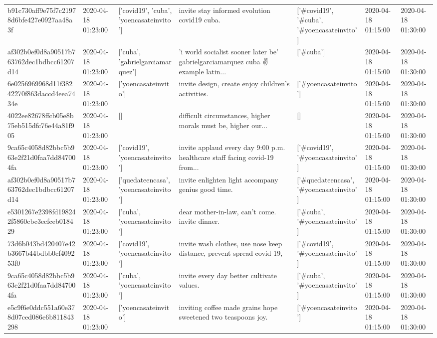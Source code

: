 \begin{tabular}{lllllll}
b91c730aff9e75f7c21978d6bfe427e0927aa48a3f & 2020-04-18 01:23:00 & ['covid19', 'cuba', 'yoencasateinvito'] & invite stay informed evolution covid19 cuba. & ['#covid19', '#cuba', '#yoencasateinvito'] & 2020-04-18 01:15:00 & 2020-04-18 01:30:00 \\
af302b0ef0d8a90517b763762dec1bdbcc61207d14 & 2020-04-18 01:23:00 & ['cuba', 'gabrielgarciamarquez'] & 'i world socialist sooner later be' gabrielgarciamarquez cuba ✌️ example latin... & ['#cuba'] & 2020-04-18 01:15:00 & 2020-04-18 01:30:00 \\
6e0256969968d11f38242270f863daccd4eea7434e & 2020-04-18 01:23:00 & ['yoencasateinvito'] & invite design, create enjoy children's activities. & ['#yoencasateinvito'] & 2020-04-18 01:15:00 & 2020-04-18 01:30:00 \\
4022ee82678ffcb05e8b75eb515dfc76e44a81f905 & 2020-04-18 01:23:00 & [] & difficult circumstances, higher morals must be, higher our... & [] & 2020-04-18 01:15:00 & 2020-04-18 01:30:00 \\
9ca65c4058d82bbc5b963e2f21d0faa7dd847004fa & 2020-04-18 01:23:00 & ['covid19', 'yoencasateinvito'] & invite applaud every day 9:00 p.m. healthcare staff facing covid-19 from... & ['#covid19', '#yoencasateinvito'] & 2020-04-18 01:15:00 & 2020-04-18 01:30:00 \\
af302b0ef0d8a90517b763762dec1bdbcc61207d14 & 2020-04-18 01:23:00 & ['quedateencasa', 'yoencasateinvito'] & invite enlighten light accompany genius good time. & ['#quedateencasa', '#yoencasateinvito'] & 2020-04-18 01:15:00 & 2020-04-18 01:30:00 \\
e5301267e2398fd198242f5860cbc3ecfceb018429 & 2020-04-18 01:23:00 & ['cuba', 'yoencasateinvito'] & dear mother-in-law, can't come. invite dinner. & ['#cuba', '#yoencasateinvito'] & 2020-04-18 01:15:00 & 2020-04-18 01:30:00 \\
73d6b043bd420407e42b3667b44bdbb0cf409253f0 & 2020-04-18 01:23:00 & ['covid19', 'yoencasateinvito'] & invite wash clothes, use nose keep distance, prevent spread covid-19, & ['#covid19', '#yoencasateinvito'] & 2020-04-18 01:15:00 & 2020-04-18 01:30:00 \\
9ca65c4058d82bbc5b963e2f21d0faa7dd847004fa & 2020-04-18 01:23:00 & ['cuba', 'yoencasateinvito'] & invite every day better cultivate values. & ['#cuba', '#yoencasateinvito'] & 2020-04-18 01:15:00 & 2020-04-18 01:30:00 \\
e5c9f6e0ddc551a60e378d07ced086e6b811843298 & 2020-04-18 01:23:00 & ['yoencasateinvito'] & inviting coffee made grains hope sweetened two teaspoons joy. & ['#yoencasateinvito'] & 2020-04-18 01:15:00 & 2020-04-18 01:30:00 \\

\end{tabular}
